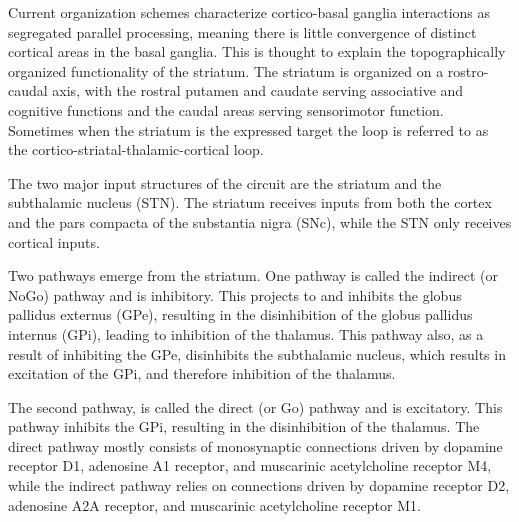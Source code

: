 \documentclass[]{book}
\begin{document}
Current organization schemes characterize cortico-basal ganglia interactions as segregated parallel processing, meaning there is little convergence of distinct cortical areas in the basal ganglia. This is thought to explain the topographically organized functionality of the striatum. The striatum is organized on a rostro-caudal axis, with the rostral putamen and caudate serving associative and cognitive functions and the caudal areas serving sensorimotor function. Sometimes when the striatum is the expressed target the loop is referred to as the cortico-striatal-thalamic-cortical loop.

The two major input structures of the circuit are the striatum and the subthalamic nucleus (STN). The striatum receives inputs from both the cortex and the pars compacta of the substantia nigra (SNc), while the STN only receives cortical inputs.

Two pathways emerge from the striatum. One pathway is called the indirect (or NoGo) pathway and is inhibitory. This projects to and inhibits the globus pallidus externus (GPe), resulting in the disinhibition of the globus pallidus internus (GPi), leading to inhibition of the thalamus. This pathway also, as a result of inhibiting the GPe, disinhibits the subthalamic nucleus, which results in excitation of the GPi, and therefore inhibition of the thalamus.

The second pathway, is called the direct (or Go) pathway and is excitatory. This pathway inhibits the GPi, resulting in the disinhibition of the thalamus. The direct pathway mostly consists of monosynaptic connections driven by dopamine receptor D1, adenosine A1 receptor, and muscarinic acetylcholine receptor M4, while the indirect pathway relies on connections driven by dopamine receptor D2, adenosine A2A receptor, and muscarinic acetylcholine receptor M1.
\end{document}
